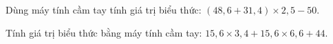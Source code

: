 \begin{ex} %
Dùng máy tính cầm tay tính giá trị biểu thức: $(48{,}6 + 31{,}4) \times 2{,}5 - 50$.
\end{ex}

\begin{ex} %
Tính giá trị biểu thức bằng máy tính cầm tay: $15{,}6 \times 3{,}4 + 15{,}6 \times 6{,}6 + 44$.
\end{ex}
